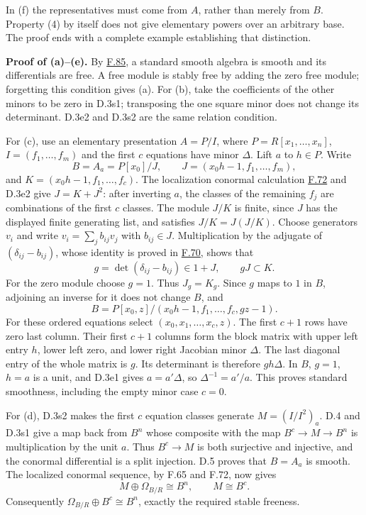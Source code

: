 \documentclass[11pt,a4paper,openany]{report}
\begin{document}
In (f) the representatives must come from \(A\), rather than merely from \(B\). Property (4) by itself does not give elementary powers over an arbitrary base. The proof ends with a complete example establishing that distinction.

\textbf{Proof of (a)--(e).} By \hyperref[AG-RG-S05-algebra-lemma-standard-smooth]{F.85}, a standard smooth algebra is smooth and its differentials are free. A free module is stably free by adding the zero free module; forgetting this condition gives (a). For (b), take the coefficients of the other minors to be zero in D.3s1; transposing the one square minor does not change its determinant. D.3e2 and D.3s2 are the same relation condition.

For (c), use an elementary presentation \(A=P/I\), where \(P=R[x_1,\ldots,x_n]\), \(I=(f_1,\ldots,f_m)\) and the first \(c\) equations have minor \(\Delta\). Lift \(a\) to \(h\in P\). Write \[B=A_a=P[x_0]/J,\qquad J=(x_0h-1,f_1,\ldots,f_m),\] and \(K=(x_0h-1,f_1,\ldots,f_c)\). The localization conormal calculation \hyperref[AG-RG-S05-algebra-lemma-principal-localization-NL]{F.72} and D.3e2 give \(J=K+J^2\): after inverting \(a\), the classes of the remaining \(f_j\) are combinations of the first \(c\) classes. The module \(J/K\) is finite, since \(J\) has the displayed finite generating list, and satisfies \(J/K=J(J/K)\). Choose generators \(v_i\) and write \(v_i=\sum_j b_{ij}v_j\) with \(b_{ij}\in J\). Multiplication by the adjugate of \((\delta_{ij}-b_{ij})\), whose identity is proved in \hyperref[AG-RG-S05-algebra-lemma-matrix-left-inverse]{F.70}, shows that \[g=\det(\delta_{ij}-b_{ij})\in1+J,\qquad gJ\subset K.\] For the zero module choose \(g=1\). Thus \(J_g=K_g\). Since \(g\) maps to \(1\) in \(B\), adjoining an inverse for it does not change \(B\), and \[B=P[x_0,z]/(x_0h-1,f_1,\ldots,f_c,gz-1).\] For these ordered equations select \((x_0,x_1,\ldots,x_c,z)\). The first \(c+1\) rows have zero last column. Their first \(c+1\) columns form the block matrix with upper left entry \(h\), lower left zero, and lower right Jacobian minor \(\Delta\). The last diagonal entry of the whole matrix is \(g\). Its determinant is therefore \(gh\Delta\). In \(B\), \(g=1\), \(h=a\) is a unit, and D.3e1 gives \(a=a'\Delta\), so \(\Delta^{-1}=a'/a\). This proves standard smoothness, including the empty minor case \(c=0\).

For (d), D.3s2 makes the first \(c\) equation classes generate \(M=(I/I^2)_a\). D.4 and D.3s1 give a map back from \(B^n\) whose composite with the map \(B^c\to M\to B^n\) is multiplication by the unit \(a\). Thus \(B^c\to M\) is both surjective and injective, and the conormal differential is a split injection. D.5 proves that \(B=A_a\) is smooth. The localized conormal sequence, by F.65 and F.72, now gives \[M\oplus\Omega_{B/R}\cong B^n,\qquad M\cong B^c.\] Consequently \(\Omega_{B/R}\oplus B^c\cong B^n\), exactly the required stable freeness.
\end{document}
